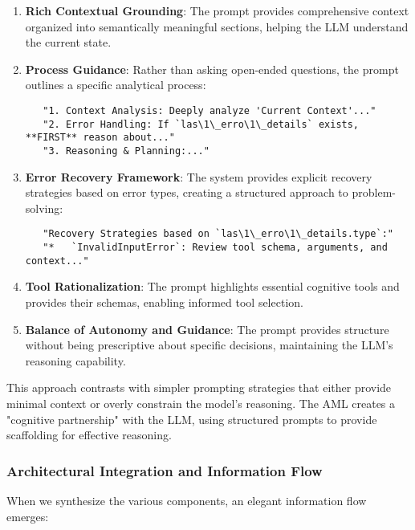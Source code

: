 \documentclass[12pt,a4paper]{article}
\begin{document}
\begin{enumerate}[label=\arabic*.]
    \item \textbf{Rich Contextual Grounding}: The prompt provides comprehensive context organized into semantically meaningful sections, helping the LLM understand the current state.
    \item \textbf{Process Guidance}: Rather than asking open-ended questions, the prompt outlines a specific analytical process:
    \begin{verbatim}
   "1. Context Analysis: Deeply analyze 'Current Context'..."
   "2. Error Handling: If `las\1\_erro\1\_details` exists, **FIRST** reason about..."
   "3. Reasoning & Planning:..."
    \end{verbatim}
    \item \textbf{Error Recovery Framework}: The system provides explicit recovery strategies based on error types, creating a structured approach to problem-solving:
    \begin{verbatim}
   "Recovery Strategies based on `las\1\_erro\1\_details.type`:"
   "*   `InvalidInputError`: Review tool schema, arguments, and context..."
    \end{verbatim}
    \item \textbf{Tool Rationalization}: The prompt highlights essential cognitive tools and provides their schemas, enabling informed tool selection.
    \item \textbf{Balance of Autonomy and Guidance}: The prompt provides structure without being prescriptive about specific decisions, maintaining the LLM's reasoning capability.
\end{enumerate}

This approach contrasts with simpler prompting strategies that either provide minimal context or overly constrain the model's reasoning. The AML creates a "cognitive partnership" with the LLM, using structured prompts to provide scaffolding for effective reasoning.

\subsubsection*{Architectural Integration and Information Flow}

When we synthesize the various components, an elegant information flow emerges:
\end{document}
